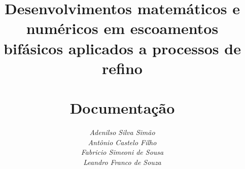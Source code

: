 \documentclass[11pt]{report}
\begin{document}
\title{{\huge \bf Desenvolvimentos matemáticos e numéricos em escoamentos bifásicos aplicados a processos de refino} \\ \quad \\  Documentação}
\author{\it Adenilso Silva Simão \\ \it Antônio Castelo Filho \\ \it Fabricio Simeoni de Sousa \\ \it Leandro Franco de Souza}
\date{}
\maketitle

\tableofcontents









\end{document}
